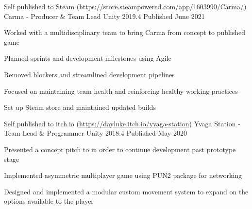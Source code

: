 \begin{cventries}
    \cventry
    {Self published to Steam (\href{https://store.steampowered.com/app/1603990/Carma/}{https://store.steampowered.com/app/1603990/Carma/})}
    {Carma - Producer \& Team Lead}
    {Unity 2019.4}
    {Published June 2021}
    {
        \begin{cvitems}
            \item Worked with a multidisciplinary team to bring Carma from concept to published game
            \item Planned sprints and development milestones using Agile
            \item Removed blockers and streamlined development pipelines
            \item Focused on maintaining team health and reinforcing healthy working practices
            \item Set up Steam store and maintained updated builds
        \end{cvitems}
    }

    \cventry
    {Self published to itch.io (\href{https://dayluke.itch.io/yvaga-station}{https://dayluke.itch.io/yvaga-station})}
    {Yvaga Station - Team Lead \& Programmer}
    {Unity 2018.4}
    {Published May 2020}
    {
        \begin{cvitems}
            \item Presented a concept pitch to in order to continue development past prototype stage
            \item Implemented asymmetric multiplayer game using PUN2 package for networking
            \item Designed and implemented a modular custom movement system to expand on the options available to the player
        \end{cvitems}
    }
\end{cventries}